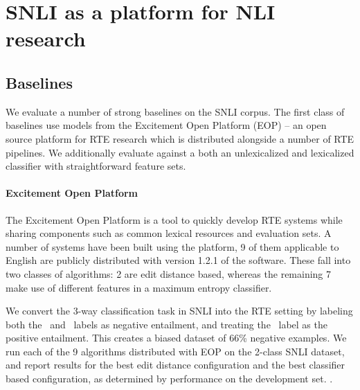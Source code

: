 \section{SNLI as a platform for NLI research}

%
%
\subsection{Baselines}
We evaluate a number of strong baselines on the SNLI corpus.
The first class of baselines use models from the Excitement Open
  Platform (EOP) 
  \cite{pado2014design,magnini2014excitement}
  -- an open source platform for RTE research which
  is distributed alongside a number of RTE pipelines.
We additionally evaluate against a both an unlexicalized and lexicalized
  classifier with straightforward feature sets.


%
%
\paragraph{Excitement Open Platform}
The Excitement Open Platform is a tool to quickly develop RTE systems
  while sharing components such as common lexical resources and 
  evaluation sets.
A number of systems have been built using the platform, 9 of them
  applicable to English are publicly distributed with version 1.2.1
  of the software.
These fall into two classes of algorithms: 2 are edit distance based,
  whereas the remaining 7 make use of different features in a
  maximum entropy classifier.

We convert the 3-way classification task in SNLI into the RTE setting
  by labeling both the \unknown\ and \contradiction\
  labels as negative entailment, and treating the \entailment\ label as
  the positive entailment.
This creates a biased dataset of 66\% negative examples.
We run each of the 9 algorithms distributed with EOP on the 2-class
  SNLI dataset, and report results for the best edit distance 
  configuration and the best classifier based configuration, as
  determined by performance on the development set.
.

%
%
\def\t#1{\small{#1}}
\def\b#1{\t{\textbf{#1}}}
\def\colspaceS{2.0mm}
\def\colspaceM{3.0mm}
\def\colspaceL{4.0mm}

